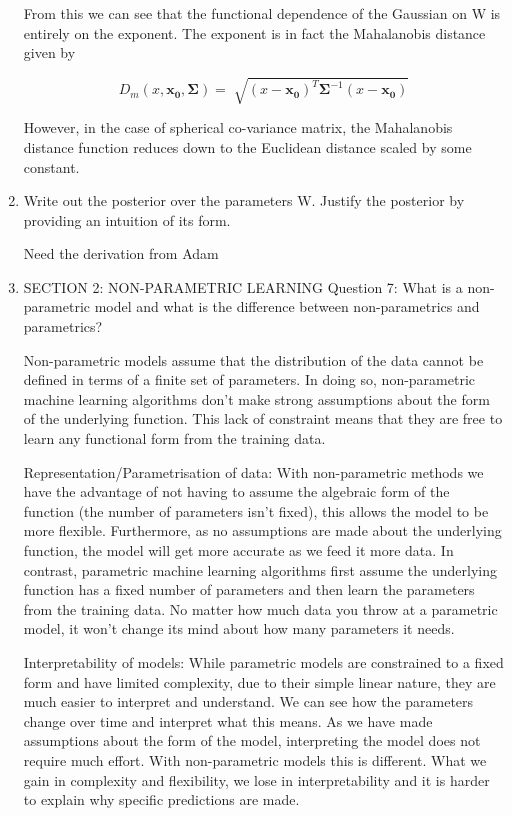 \documentclass[13pt]{article}
\begin{document}
\begin{enumerate}
  From this we can see that the functional dependence of the Gaussian on W is entirely on the exponent. The exponent is in fact the Mahalanobis distance given by
  
  \begin{equation}
      D_m(x,\mathbf{x_0},\mathbf{\Sigma}) = \sqrt[]{(x-\mathbf{x_0})^T \mathbf{\Sigma}^{-1} (x-\mathbf{x_0})}
  \end{equation}
  
  However, in the case of spherical co-variance matrix, the Mahalanobis distance function reduces down to the Euclidean distance scaled by some constant.
  
  \item {\large Write out the posterior over the parameters W. Justify the posterior by providing an intuition of its form.}
  
  Need the derivation from Adam
  
  \item {\large SECTION 2: NON-PARAMETRIC LEARNING}
  Question 7: What is a non-parametric model and what is the difference between non-parametrics and parametrics?
  
  Non-parametric models assume that the distribution of the data cannot be defined in terms of a finite set of parameters. In doing so, non-parametric machine learning algorithms don't make strong assumptions about the form of the underlying function. This lack of constraint means that they are free to learn any functional form from the training data. 
  
  Representation/Parametrisation of data:
  With non-parametric methods we have the advantage of not having to assume the algebraic form of the function (the number of parameters isn't fixed), this allows the model to be more flexible. Furthermore, as no assumptions are made about the underlying function, the model will get more accurate as we feed it more data. In contrast, parametric machine learning algorithms first assume the underlying function has a fixed number of parameters and then learn the parameters from the training data. No matter how much data you throw at a parametric model, it won't change its mind about how many parameters it needs.  
  
  Interpretability of models:
  While parametric models are constrained to a fixed form and have limited complexity, due to their simple linear nature, they are much easier to interpret and understand. We can see how the parameters change over time and interpret what this means. As we have made assumptions about the form of the model, interpreting the model does not require much effort. With non-parametric models this is different. What we gain in complexity and flexibility, we lose in interpretability and it is harder to explain why specific predictions are made.
  

\end{enumerate}
\end{document}

